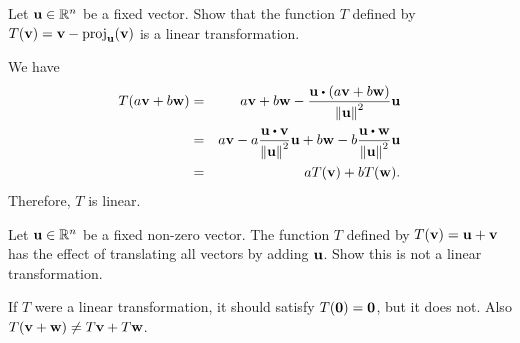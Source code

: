 \begin{ex}
  Let $\vect{u}\in\R^n$ be a fixed vector.  Show that the function $T$
  defined by
  $T(\vect{v}) = \vect{v}-\proj_{\vect{u}}(\vect{v})$ is a
  linear transformation.
  \begin{sol}
    We have
    \begin{eqnarray*}
      T(a\vect{v}+b\vect{w})
      &=& a\vect{v}+b\vect{w}
          -\frac{\vect{u}\dotprod(a\vect{v}+b\vect{w})}{\norm{\vect{u}}^2}
          \vect{u} \\
      &=& a\vect{v}
          -a\frac{\vect{u}\dotprod\vect{v}}{\norm{\vect{u}}^2}\vect{u}
          +b\vect{w}
          -b\frac{\vect{u}\dotprod\vect{w}}{\norm{\vect{u}}^2}\vect{u} \\
      &=& aT(\vect{v}) +bT(\vect{w}).
    \end{eqnarray*}
    Therefore, $T$ is linear.
  \end{sol}
\end{ex}

\begin{ex}
  Let $\vect{u}\in\R^n$ be a fixed non-zero vector. The function $T$
  defined by $T(\vect{v})=\vect{u}+\vect{v}$ has the effect of
  translating all vectors by adding $\vect{u}$. Show this is not a
  linear transformation.
  \begin{sol}
    If $T$ were a linear transformation, it should satisfy
    $T(\vect{0}) = \vect{0}$, but it does not. Also
    $T(\vect{v}+\vect{w}) \neq T\vect{v}+T\vect{w}$.
  \end{sol}
\end{ex}

